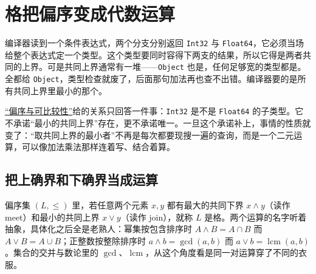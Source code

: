 \section{格把偏序变成代数运算}
\label{sec:04-Discrete-Mathematics/08-Rings-and-Lattices/02}

编译器读到一个条件表达式，两个分支分别返回 \texttt{Int32} 与 \texttt{Float64}，它必须当场给整个表达式定一个类型。这个类型要同时容得下两支的结果，所以它得是两者共同的上界。可是共同上界通常有一堆——\texttt{Object} 也是，任何足够宽的类型都是。全都给 \texttt{Object}，类型检查就废了，后面那句加法再也查不出错。编译器要的是所有共同上界里最小的那个。

\hyperref[sec:01-Mathematical-Language/02-Sets-Relations-Functions/03]{``偏序与可比较性''}给的关系只回答一件事：\texttt{Int32} 是不是 \texttt{Float64} 的子类型。它不承诺``最小的共同上界''存在，更不承诺唯一。一旦这个承诺补上，事情的性质就变了：``取共同上界的最小者''不再是每次都要现搜一遍的查询，而是一个二元运算，可以像加法乘法那样连着写、结合着算。

\subsection{把上确界和下确界当成运算}

偏序集 \((L,\le)\) 里，若任意两个元素 \(x,y\) 都有最大的共同下界 \(x\wedge y\)（读作 meet）和最小的共同上界 \(x\vee y\)（读作 join），就称 \(L\) 是格。两个运算的名字听着抽象，具体化之后全是老熟人：幂集按包含排序时 \(A\wedge B=A\cap B\) 而 \(A\vee B=A\cup B\)；正整数按整除排序时 \(a\wedge b=\gcd(a,b)\) 而 \(a\vee b=\operatorname{lcm}(a,b)\)。集合的交并与数论里的 \(\gcd\)、\(\operatorname{lcm}\)，从这个角度看是同一对运算穿了不同的衣服。

